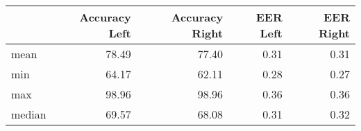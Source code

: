 \begin{tabular}{lrrrr}
\toprule
{} &  Accuracy Left &  Accuracy Right &  EER Left &  EER Right \\
\midrule
mean   &          78.49 &           77.40 &      0.31 &       0.31 \\
min    &          64.17 &           62.11 &      0.28 &       0.27 \\
max    &          98.96 &           98.96 &      0.36 &       0.36 \\
median &          69.57 &           68.08 &      0.31 &       0.32 \\
\bottomrule
\end{tabular}
